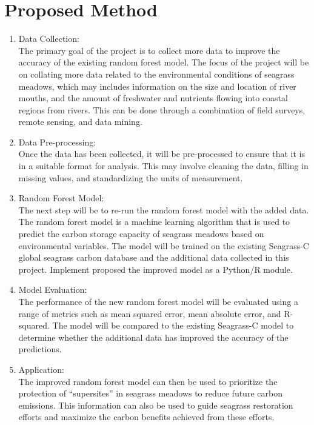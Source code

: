 \documentclass[a4paper]{report}
\begin{document}
\section{Proposed Method}
\begin{enumerate}[1]

\item Data Collection:\\
The primary goal of the project is to collect more data to improve the accuracy of the existing random forest model. The focus of the project will be on collating more data related to the environmental conditions of seagrass meadows, which may includes information on the size and location of river mouths, and the amount of freshwater and nutrients flowing into coastal regions from rivers. This can be done through a combination of field surveys, remote sensing, and data mining.

\item Data Pre-processing:\\
Once the data has been collected, it will be pre-processed to ensure that it is in a suitable format for analysis. This may involve cleaning the data, filling in missing values, and standardizing the units of measurement.

\item Random Forest Model:\\
The next step will be to re-run the random forest model with the added data. The random forest model is a machine learning algorithm that is used to predict the carbon storage capacity of seagrass meadows based on environmental variables. The model will be trained on the existing Seagrass-C global seagrass carbon database and the additional data collected in this project. Implement proposed the improved model as a Python/R module.

\item Model Evaluation:\\
The performance of the new random forest model will be evaluated using a range of metrics such as mean squared error, mean absolute error, and R-squared. The model will be compared to the existing Seagrass-C model to determine whether the additional data has improved the accuracy of the predictions.

\item Application:\\
The improved random forest model can then be used to prioritize the protection of “supersites” in seagrass meadows to reduce future carbon emissions. This information can also be used to guide seagrass restoration efforts and maximize the carbon benefits achieved from these efforts.

\end{enumerate}
\end{document}
